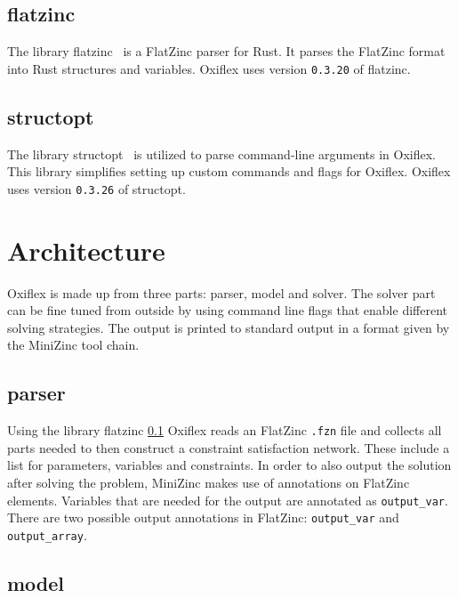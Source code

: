 \subsection{flatzinc} \label{flatzinc}

The library flatzinc~\cite{flatzinc:2020} is a FlatZinc parser for Rust. It parses the FlatZinc format into Rust structures and variables. Oxiflex uses version \verb|0.3.20| of flatzinc.

\subsection{structopt}

The library structopt~\cite{structopt:2020} is utilized to parse command-line arguments in Oxiflex. This library simplifies setting up custom commands and flags for Oxiflex. Oxiflex uses version \verb|0.3.26| of structopt.

\section{Architecture}

Oxiflex is made up from three parts: parser, model and solver. The solver part can be fine tuned from outside by using command line flags that enable different solving strategies. The output is printed to standard output in a format given by the MiniZinc tool chain.

\subsection{parser}

Using the library flatzinc \ref{flatzinc} Oxiflex reads an FlatZinc \verb|.fzn| file and collects all parts needed to then construct a constraint satisfaction network. These include a list for parameters, variables and constraints. In order to also output the solution after solving the problem, MiniZinc makes use of annotations on FlatZinc elements. Variables that are needed for the output are annotated as \verb|output_var|. There are two possible output annotations in FlatZinc: \verb|output_var| and \verb|output_array|.

\subsection{model} \label{model}

